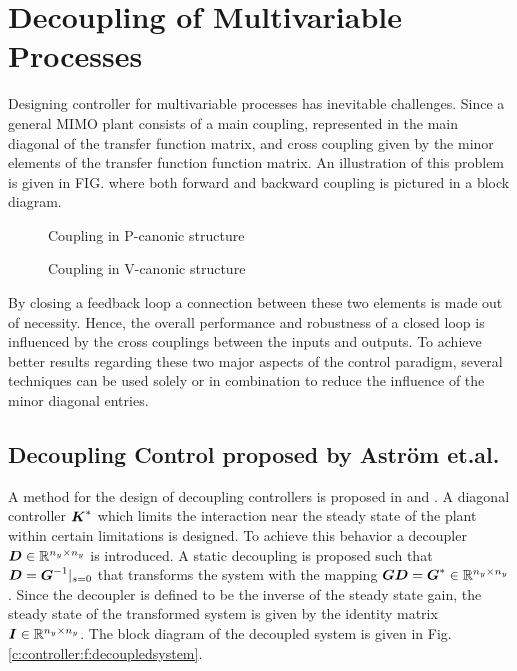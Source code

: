 \section{Decoupling of Multivariable Processes} %
\label{c:controller:s:decoupling}

Designing controller for multivariable processes has inevitable challenges. Since a general MIMO plant consists of a main coupling, represented in the main diagonal of the transfer function matrix, and cross coupling given by the minor elements of the transfer function function matrix. An illustration of this problem is given in FIG. where both forward and backward coupling is pictured in a block diagram.\\

\begin{figure}[h]
\begin{minipage}[t]{0.45\textwidth}

\caption{Coupling in P-canonic structure}
\label{c:controller:f:pcanon}
\end{minipage}%
\hspace{0.05\textwidth}
\begin{minipage}[t]{0.45\textwidth}

\caption{Coupling in V-canonic structure}
\label{c:controller:f:vcanon}
\end{minipage}
\end{figure}


By closing a feedback loop a connection between these two elements is made out of necessity. Hence, the overall performance and robustness of a closed loop is influenced by the cross couplings between the inputs and outputs. To achieve better results regarding these two major aspects of the control paradigm, several techniques can be used solely or in combination to reduce the influence of the minor diagonal entries.\\


\subsection{Decoupling Control proposed by Astr\"om et.al.}
\label{c:controller:sub:astrom}

A method for the design of decoupling controllers is proposed in \cite{Astrom2001a} and \cite{Astrom2006}. A diagonal controller $\mbox{\boldmath$K$}^*$ which limits the interaction near the steady state of the plant within certain limitations is designed. To achieve this behavior a decoupler $\mbox{\boldmath$D$} \in  \mathbb{R}^{n_y \times n_y}$ is introduced. A static decoupling is proposed such that $\mbox{\boldmath$D$} = \mbox{\boldmath$G$}^{-1}|_{s=0}$ that transforms the system with the mapping $\mbox{\boldmath$G$} \mbox{\boldmath$D$} = \mbox{\boldmath$G$}^* \in \mathbb{R}^{n_y \times n_y}$. Since the decoupler is defined to be the inverse of the steady state gain, the steady state of the transformed system is given by the identity matrix $\mbox{\boldmath$I$} \in \mathbb{R}^{n_y \times n_y}$. The block diagram of the decoupled system is given in Fig.\ref{c:controller:f:decoupledsystem}.

